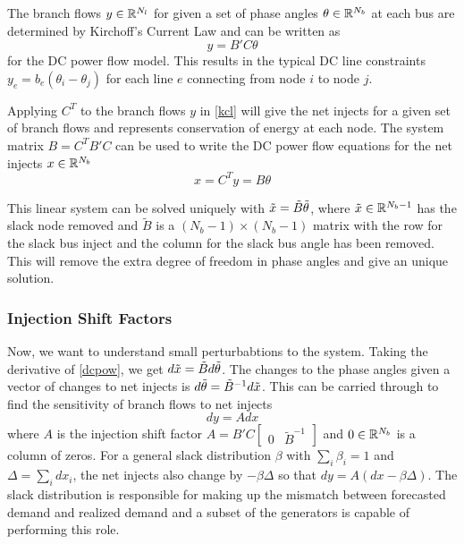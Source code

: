 The branch flows $y \in \mathbb{R}^{N_l}$ for given a set of phase angles $\theta \in \mathbb{R}^{N_b}$ at each bus are determined by Kirchoff's Current Law and can be written as
\begin{equation}\label{kcl}
y=B' C \theta
\end{equation}
for the DC power flow model.  This results in the typical DC line constraints $y_{e} = b_{e} (\theta_i - \theta_j)$ for each line $e$ connecting from node $i$ to node $j$.  

Applying $C^T$ to the branch flows $y$ in \ref{kcl} will give the net injects for a given set of branch flows and represents conservation of energy at each node.
  The system matrix $B = C^T B' C$ can be used to write the DC power flow equations for the net injects $x \in \mathbb{R}^{N_b}$
\begin{equation}\label{dcpow}
x = C^T y = B \theta
\end{equation}

This linear system can be solved uniquely with $\tilde{x} = \tilde{B} \tilde{\theta}$, where $\tilde{x} \in \mathbb{R}^{N_b-1}$ has the slack node removed and $\tilde{B}$ is a $(N_b-1) \times (N_b-1)$ matrix with the row for the slack bus inject and the column for the slack bus angle has been removed.  This will remove the extra degree of freedom in phase angles and give an unique solution.

\subsubsection*{Injection Shift Factors}
Now, we want to understand small perturbabtions to the system.  Taking the derivative of \ref{dcpow}, we get $d \tilde{x} = \tilde{B} d \tilde{\theta} $.  The changes to the phase angles given a vector of changes to net injects is $ d \tilde{\theta} = \tilde{B}^{-1} d \tilde{x} $.  This can be carried through to find the sensitivity of branch flows to net injects 
\begin{equation}\label{isf}
 d y = A d x 
\end{equation}
where $A$ is the injection shift factor $A = B' C \left[\begin{array}{cc} 0 & \tilde{B}^{-1} \end{array} \right]$ and $0\in \mathbb{R}^{N_b}$ is a column of zeros.  For a general slack distribution $\beta$ with $\sum_i \beta_i=1$ and $\Delta = \sum_i dx_i$, the net injects also change by $- \beta \Delta$ so that $dy = A\left( dx - \beta \Delta \right)$.  The slack distribution is responsible for making up the mismatch between forecasted demand and realized demand and a subset of the generators is capable of performing this role.



